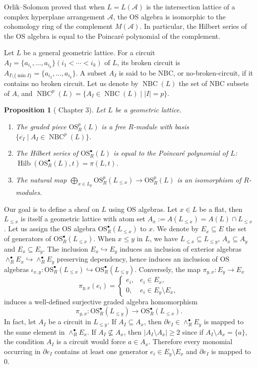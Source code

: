 \documentclass[10pt,a4paper]{amsart}
\numberwithin{equation}{section}
\newtheorem{prop}[thm]{Proposition}
\numberwithin{equation}{section}
\newcommand{\A}{\mathcal{A}}
\newcommand{\OS}{\mathrm{OS}}
\DeclareMathOperator{\Hilb}{Hilb}
\DeclareMathOperator{\NBC}{NBC}
\begin{document}
Orlik--Solomon \cite{Orlik1980} proved that when $L=L(\A)$ is the intersection lattice of a complex hyperplane arrangement $\A$, the OS algebra is isomorphic to the cohomology ring of the complement $M(\A)$. In particular, the Hilbert series of the OS algebra is equal to the Poincar\'e polynomial of the complement.

Let $L$ be a general geometric lattice. For a circuit $A_I=\{a_{i_1},\ldots,a_{i_k}\}(i_1<\cdots<i_k)$ of $L$, its broken circuit is $A_{I\setminus\{\min I\}}=\{a_{i_2},\ldots,a_{i_k}\}$. A subset $A_I$ is said to be NBC, or no-broken-circuit, if it contains no broken circuit. Let us denote by $\NBC(L)$ the set of NBC subsets of $A$, and $\NBC^p(L)=\{A_I\in\NBC(L)\mid |I|=p\}$.

\begin{prop}[\cite{Orlik1992} Chapter 3]\label{OSproperties}
Let $L$ be a geometric lattice.
\begin{enumerate}
    \item The graded piece $\OS^p_R(L)$ is a free $R$-module with basis $\{\overline{e_I}\mid A_I\in \NBC^p(L)\}$.
    \item The Hilbert series of $\OS^\bullet_R(L)$ is equal to the Poincar\'e polynomial of $L$: $\Hilb(\OS^\bullet_R(L),t)=\pi(L,t)$.
    \item The natural map $\bigoplus_{x\in L_p}\OS^p_R(L_{\leq x})\to\OS^p_R(L)$ is an isomorphism of $R$-modules.
\end{enumerate}

\end{prop}


Our goal is to define a sheaf on $L$ using OS algebras. Let $x\in L$ be a flat, then $L_{\leq x}$ is itself a geometric lattice with atom set $A_x:=A(L_{\leq x})=A(L)\cap L_{\leq x}$. Let us assign the OS algebra $\OS_R^\bullet(L_{\leq x})$ to $x$. We denote by $E_x\subseteq E$ the set of generators of $\OS_R^\bullet(L_{\leq x})$. When $x\leq y$ in $L$, we have $L_{\leq x}\subseteq L_{\leq y}$, $A_x\subseteq A_y$ and $E_x\subseteq E_y$. The inclusion $E_x\hookrightarrow E_y$ induces an inclusion of exterior algebras $\wedge^\bullet_RE_x\hookrightarrow\wedge^\bullet_RE_y$ preserving dependency, hence induces an inclusion of OS algebras $\iota_{x,y}:\OS_R^
\bullet(L_{\leq x})\hookrightarrow \OS_R^
\bullet(L_{\leq y})$. Conversely, the map $\pi_{y,x}:E_y\to E_x$
    \[
    \pi_{y,x}(e_i)=\begin{cases}
        e_i, & e_i\in E_x,\\
        0, & e_i\in E_y\setminus E_x,
    \end{cases}
    \]
induces a well-defined surjective graded algebra homomorphism
\[
    \pi_{y,x}:\OS_R^\bullet(L_{\leq y})\to \OS_R^\bullet(L_{\leq x}).
    \]
In fact, let $A_I$ be a circuit in $L_{\leq y}$. If $A_I\subseteq A_x$, then $\partial e_I\in \wedge^\bullet_RE_y$ is mapped to the same element in $\wedge^\bullet_RE_x$. If $A_I\not\subseteq A_x$, then $|A_I\setminus A_x|\geq 2$ since if $A_I\setminus A_x=\{a\}$, the condition $A_I$ is a circuit would force $a\in A_x$. Therefore every monomial occurring in $\partial e_I$ contains at least one generator $e_i\in E_y\setminus E_x$ and $\partial e_I$ is mapped to $0$. 
\end{document}
